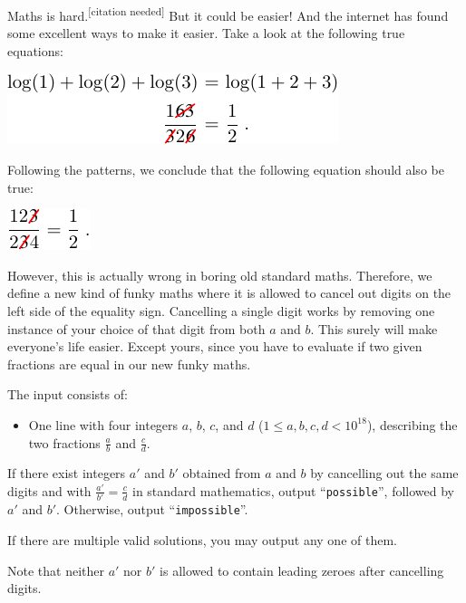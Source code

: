 
%
Maths is hard.\textsuperscript{[citation needed]}
But it could be easier!
And the internet\texttrademark{} has found some excellent ways to make it easier.
Take a look at the following true equations:
\begin{center}
    \includegraphics{fraction1.pdf}
\end{center}\vspace{-0.5\baselineskip}
Following the patterns, we conclude that the following equation should also be true:\vspace{-0.75\baselineskip}
\begin{center}
    \includegraphics{fraction2.pdf}
\end{center}\vspace{-0.5\baselineskip}
However, this is actually wrong in boring old standard maths.
Therefore, we define a new kind of funky maths where it is allowed to cancel out digits on the left side of the equality sign.
Cancelling a single digit works by removing one instance of your choice of that digit from both $a$ and $b$.
This surely will make everyone's life easier.
Except yours, since you have to evaluate if two given fractions are equal in our new funky maths.

\begin{Input}
The input consists of:
\begin{itemize}
\item One line with four integers $a$, $b$, $c$, and $d$ ($1\leq a,b,c,d<10^{18}$), describing the two fractions $\frac{a}{b}$ and $\frac{c}{d}$.
\end{itemize}
\end{Input}

\begin{Output}
If there exist integers $a'$ and $b'$ obtained from $a$ and $b$ by cancelling
out the same digits and with $\frac{a'}{b'} = \frac{c}{d}$ in standard mathematics, output
``\texttt{possible}'', followed by $a'$ and $b'$.
Otherwise, output ``\texttt{impossible}''.

If there are multiple valid solutions, you may output any one of them.

Note that neither $a'$ nor $b'$ is allowed to contain leading zeroes after
cancelling digits.
\end{Output}
